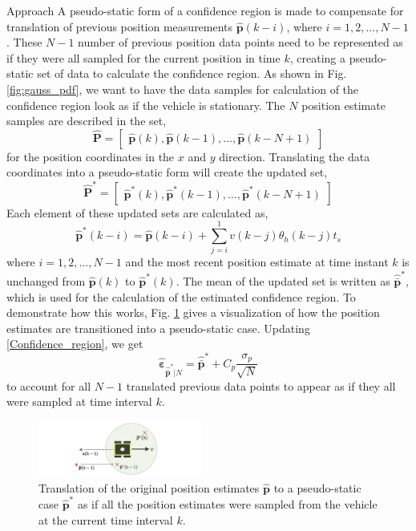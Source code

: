 \begin{section}{Approach}
A pseudo-static form of a confidence region is made to compensate for translation of previous position measurements $\hat{\bm{p}}(k-i)$, where $i=1,2,\dots,N-1$. These $N-1$ number of previous position data points need to be represented as if they were all sampled for the current position in time $k$, creating a pseudo-static set of data to calculate the confidence region. As shown in Fig. \ref{fig:gauss_pdf}, we want to have the data samples for calculation of the confidence region look as if the vehicle is stationary. The $N$ position estimate samples are described in the set,
\begin{equation}
    \hat{\bm{P}}=\begin{bmatrix} \hat{\bm{p}}(k) ,\hat{\bm{p}}(k-1),\dots,\hat{\bm{p}}(k-N+1) \end{bmatrix} 
\end{equation}
for the position coordinates in the $x$ and $y$ direction. Translating the data coordinates into a pseudo-static form will create the updated set,
\begin{equation}
    \hat{\bm{P}}^*=\begin{bmatrix} \hat{\bm{p}}^*(k) ,\hat{\bm{p}}^*(k-1),\dots,\hat{\bm{p}}^*(k-N+1) \end{bmatrix} \nonumber
\end{equation}
Each element of these updated sets are calculated as,
	\begin{equation}
	\hat{\bm{p}}^*(k-i) = \hat{\bm{p}}(k-i)+\sum_{j=i}^1 v(k-j)\theta_h(k-j)t_s 
	\end{equation}
where $i=1,2,\dots,N-1$ and the most recent position estimate at time instant $k$ is unchanged from $\hat{\bm{p}}(k)$ to $\hat{\bm{p}}^*(k)$. The mean of the updated set is written as $\hat{\bar{\bm{p}}}^*$, which is used for the calculation of the estimated confidence region. To demonstrate how this works, Fig. \ref{fig:pseudo_static} gives a visualization of how the position estimates are transitioned into a pseudo-static case. Updating \eqref{Confidence_region}, we get
    \begin{equation}
    \label{Confidence_region_updated}
		\hat{\bm{\varepsilon}}_{\hat{\bar{\bm{p}}}^*|N} = \hat{\bar{\bm{p}}}^* + C_p\frac{\sigma_p}{\sqrt{N}}
	\end{equation}
 to account for all $N-1$ translated previous data points to appear as if they all were sampled at time interval $k$.

\begin{figure}[ht!]
\vspace{1pt}
\centering
\includegraphics[width=0.48\textwidth]{pseudo_static.png}
\caption{Translation of the original position estimates $\hat{\bm{p}}$ to a pseudo-static case $\hat{\bm{p}}^*$ as if all the position estimates were sampled from the vehicle at the current time interval $k$.}
\label{fig:pseudo_static}
\end{figure}


\end{section}
